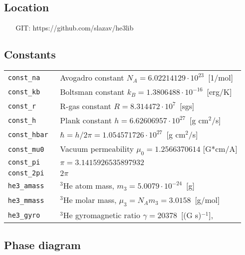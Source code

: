 \documentclass[a4paper]{article}
\begin{document}
\subsection*{Location}
\begin{itemize}
\item[GIT:]  https://github.com/slazav/he3lib
\end{itemize}


\subsection*{Constants}

\medskip
\noindent\begin{tabular}{lp{11cm}}
\tt const\_na      & Avogadro constant $N_A = 6.02214129 \cdot 10^{23}$~[1/mol]\\
\tt const\_kb      & Boltsman constant $k_B = 1.3806488 \cdot 10^{-16}$~[erg/K]\\
\tt const\_r       & R-gas constant $R = 8.314472 \cdot 10^{7}$~[sgs]\\
\tt const\_h       & Plank constant $h = 6.62606957 \cdot 10^{27}$~[g cm$^2$/s]\\
\tt const\_hbar    & $\hbar = h/2\pi = 1.054571726 \cdot 10^{27}$~[g cm$^2$/s]\\
\tt const\_mu0     & Vacuum permeability $\mu_0 = 1.2566370614$ [G*cm/A]\\
\tt const\_pi      & $\pi = 3.1415926535897932$\\
\tt const\_2pi     & $2\pi$\\
\tt he3\_amass     & $^3$He atom mass, $m_3 = 5.0079 \cdot 10^{-24}$~[g]\\
\tt he3\_mmass     & $^3$He molar mass, $\mu_3 = N_A m_3 = 3.0158$~[g/mol]\\
\tt he3\_gyro      & $^3$He gyromagnetic ratio $\gamma = 20378$~[(G s)$^{-1}$],\\
\end{tabular}
\medskip

\eject
\subsection*{Phase diagram}
\end{document}
